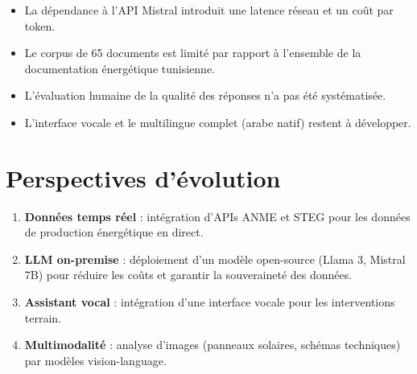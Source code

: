 \documentclass[12pt,a4paper,oneside]{report}
\begin{document}
\begin{itemize}[leftmargin=1.2cm]

\item La d\'{e}pendance \`{a} l'API Mistral introduit une latence r\'{e}seau et un co\^{u}t par token.

\item Le corpus de 65 documents est limit\'{e} par rapport \`{a} l'ensemble de la documentation \'{e}nerg\'{e}tique tunisienne.

\item L'\'{e}valuation humaine de la qualit\'{e} des r\'{e}ponses n'a pas \'{e}t\'{e} syst\'{e}matis\'{e}e.

\item L'interface vocale et le multilingue complet (arabe natif) restent \`{a} d\'{e}velopper.

\end{itemize}



\section{Perspectives d'\'{e}volution}



\begin{enumerate}[leftmargin=1.2cm]

\item \textbf{Donn\'{e}es temps r\'{e}el} : int\'{e}gration d'APIs ANME et STEG pour les donn\'{e}es de production \'{e}nerg\'{e}tique en direct.

\item \textbf{LLM on-premise} : d\'{e}ploiement d'un mod\`{e}le open-source (Llama 3, Mistral 7B) pour r\'{e}duire les co\^{u}ts et garantir la souverainet\'{e} des donn\'{e}es.

\item \textbf{Assistant vocal} : int\'{e}gration d'une interface vocale pour les interventions terrain.

\item \textbf{Multimodalit\'{e}} : analyse d'images (panneaux solaires, sch\'{e}mas techniques) par mod\`{e}les vision-language.

\end{enumerate}





\end{document}
